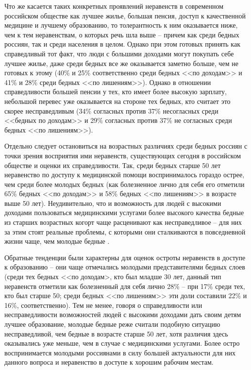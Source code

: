 Что же касается таких конкретных проявлений неравенств в современном 
российском обществе как лучшее жилье, большая пенсия, доступ к качественной 
медицине и лучшему образованию, то толерантность к ним оказывается ниже, чем к 
тем неравенствам, о которых речь шла выше -- причем как среди бедных россиян, 
так и среди населения в целом. Однако при этом готовых принять как 
справедливый тот факт, что люди с большими доходами могут покупать себе лучшее 
жилье, даже среди бедных все же оказывается заметно больше, чем не готовых к 
этому (40\% и 25\% соответственно среди бедных <<по доходам>> и 41\% и 28\% 
среди бедных <<по лишениям>>). Однако в отношении справедливости большей 
пенсии у тех, кто имеет более высокую зарплату, небольшой перевес уже 
оказывается на стороне тех бедных, кто считает это скорее несправедливым 
(34\% согласных против 37\% несогласных среди <<бедных по доходам>> и 29\% 
согласных против 37\% не согласных среди бедных <<по лишениям>>).

Отдельно следует остановиться на возрастных различиях среди бедных россиян с 
точки зрения восприятия ими неравенств, существующих сегодня в российском 
обществе и оценки их справедливости. Так, среди бедных старше 50 лет 
неравенство по доступу к медицинской помощи воспринималось гораздо острее, 
чем среди более молодых бедных (как болезненное лично для себя его отметили 
65\% бедных <<по доходам>> и 58\% бедных <<по лишениям>> в возрасте выше 50 
лет). Неудивительно, что и возможность для людей с высокими доходами 
пользоваться медицинскими услугами более высокого качества бедные из старших 
возрастных когорт чаще расценивают как несправедливое -- для них за этим стоят 
реальные проблемы, с которыми они сталкиваются в повседневной жизни чаще, чем 
молодые бедные \cite{vestnik}.

Обратные тенденции были характерны для оценок остроты неравенств в доступе к 
образованию -- они чаще отмечались молодыми представителями бедных слоев (среди 
тех бедных <<по доходам>, кто был младше 30 лет, данный тип неравенств отметили 
как болезненный для себя лично 28\% -- при 17\% среди тех, кто был старше 50; 
среди бедных <<по лишениям>> эти доли составили 22\% и 16\%, соответственно). 
Тем не менее, говоря о справедливости или несправедливости возможностей людей 
с высокими доходами дать своим детям лучшее образование, молодые бедные реже 
считали подобную ситуацию несправедливой, чем бедные в возрасте старше 50 лет, 
хотя различия здесь оказывались уже меньше, чем в случае с медицинскими 
услугами. Более остро воспринимается молодыми россиянами в силу большей 
актуальности для них данного вопроса и неравенство в доступе к хорошим рабочим 
местам.

